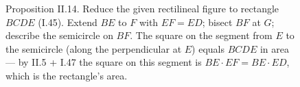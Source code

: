 \begin{figure}[H]
\centering
{}
\caption{Proposition II.14. Reduce the given rectilineal figure to
rectangle $BCDE$ (I.45). Extend $BE$ to $F$ with $EF = ED$; bisect $BF$
at $G$; describe the semicircle on $BF$. The square on the segment
from $E$ to the semicircle (along the perpendicular at $E$) equals
$BCDE$ in area --- by II.5 + I.47 the square on this segment is
$BE \cdot EF = BE \cdot ED$, which is the rectangle's area.}
\label{fig:II.14}
\end{figure}
